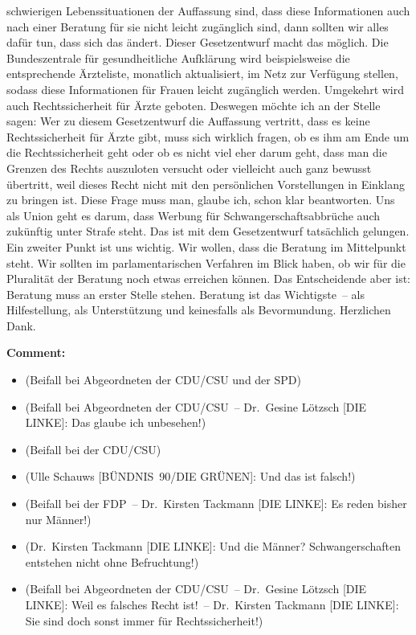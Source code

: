 \documentclass{article}
\begin{document}
schwierigen Lebenssituationen der Auffassung sind, dass diese Informationen auch nach einer Beratung für sie nicht leicht zugänglich sind, dann sollten wir alles dafür tun, dass sich das ändert. Dieser Gesetzentwurf macht das möglich. Die Bundeszentrale für gesundheitliche Aufklärung wird beispielsweise die entsprechende Ärzteliste, monatlich aktualisiert, im Netz zur Verfügung stellen, sodass diese Informationen für Frauen leicht zugänglich werden.  Umgekehrt wird auch Rechtssicherheit für Ärzte geboten. Deswegen möchte ich an der Stelle sagen: Wer zu diesem Gesetzentwurf die Auffassung vertritt, dass es keine Rechtssicherheit für Ärzte gibt, muss sich wirklich fragen, ob es ihm am Ende um die Rechtssicherheit geht oder ob es nicht viel eher darum geht, dass man die Grenzen des Rechts auszuloten versucht oder vielleicht auch ganz bewusst übertritt, weil dieses Recht nicht mit den persönlichen Vorstellungen in Einklang zu bringen ist.  Diese Frage muss man, glaube ich, schon klar beantworten. Uns als Union geht es darum, dass Werbung für Schwangerschaftsabbrüche auch zukünftig unter Strafe steht. Das ist mit dem Gesetzentwurf tatsächlich gelungen. Ein zweiter Punkt ist uns wichtig. Wir wollen, dass die Beratung im Mittelpunkt steht. Wir sollten im parlamentarischen Verfahren im Blick haben, ob wir für die Pluralität der Beratung noch etwas erreichen können. Das Entscheidende aber ist: Beratung muss an erster Stelle stehen. Beratung ist das Wichtigste – als Hilfestellung, als Unterstützung und keinesfalls als Bevormundung. Herzlichen Dank.  

\noindent\textbf{Comment:}
\begin{itemize}
    \setlength\itemsep{-3pt}
    \item (Beifall bei Abgeordneten der CDU/CSU und der SPD)
    \setlength\itemsep{-3pt}
    \item (Beifall bei Abgeordneten der CDU/CSU – Dr. Gesine Lötzsch [DIE LINKE]: Das glaube ich unbesehen!)
    \setlength\itemsep{-3pt}
    \item (Beifall bei der CDU/CSU)
    \setlength\itemsep{-3pt}
    \item (Ulle Schauws [BÜNDNIS 90/DIE GRÜNEN]: Und das ist falsch!)
    \setlength\itemsep{-3pt}
    \item (Beifall bei der FDP – Dr. Kirsten Tackmann [DIE LINKE]: Es reden bisher nur Männer!)
    \setlength\itemsep{-3pt}
    \item (Dr. Kirsten Tackmann [DIE LINKE]: Und die Männer? Schwangerschaften entstehen nicht ohne Befruchtung!)
    \setlength\itemsep{-3pt}
    \item (Beifall bei Abgeordneten der CDU/CSU – Dr. Gesine Lötzsch [DIE LINKE]: Weil es falsches Recht ist! – Dr. Kirsten Tackmann [DIE LINKE]: Sie sind doch sonst immer für Rechtssicherheit!)
\end{itemize}
\end{document}
